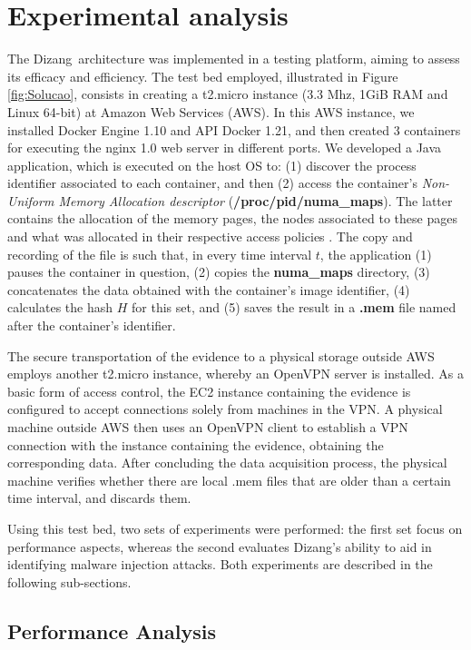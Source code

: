 \documentclass[twocolumn, notitlepage]{bmcart}%
\newcommand{\fancyname}{Dizang}
\begin{document}
\section*{Experimental analysis}
\label{sec:proposal-impl}

The \fancyname\ architecture was implemented in a testing platform, aiming to assess its efficacy and efficiency.
%
The test bed employed, illustrated in Figure \ref{fig:Solucao}, consists in creating a t2.micro instance (3.3 Mhz, 1GiB RAM and Linux 64-bit) at Amazon Web Services (AWS).
%
In this AWS instance, we installed Docker Engine 1.10 and API Docker 1.21, and then created 3 containers for executing the nginx 1.0 web server in different ports. 
%
We developed a Java application, which is executed on the host OS to: 
(1) discover the process identifier associated to each container, and then 
(2) access the container's 
%
\textit{Non-Uniform Memory Allocation descriptor} (\textbf{/proc/pid/numa\_maps}).
%
The latter contains the allocation of the memory pages, the nodes associated to these pages and what was allocated in their respective access policies \cite{UnixManPages_numa_maps}.
%
The copy and recording of the file is such that, in every time interval $t$, the application (1) pauses the container in question, (2) copies the \textbf{numa\_maps} directory, (3) concatenates the data obtained with the container's image identifier, (4) calculates the hash $H$ for this set, and (5) saves the result in a \textbf{.mem} file named after the container's identifier.


The secure transportation of the evidence to a physical storage outside AWS employs another t2.micro instance, whereby an OpenVPN server is installed.
%
As a basic form of access control, the EC2 instance containing the evidence is configured to accept connections solely from machines in the VPN.
%
A physical machine outside AWS then uses an OpenVPN client to establish a VPN connection with the instance containing the evidence, obtaining the corresponding data.
%
After concluding the data acquisition process, the physical machine verifies whether there are local .mem files that are older than a certain time interval, and discards them.


Using this test bed, two sets of experiments were performed: the first set focus on performance aspects, whereas the second evaluates \fancyname's ability to aid in identifying malware injection attacks.
%
Both experiments are described in the following sub-sections.


\subsection*{Performance Analysis}
\label{sec:proposal-exp}
\end{document}
